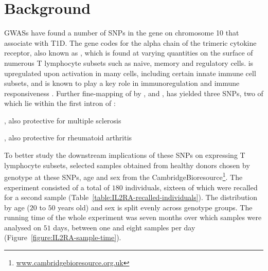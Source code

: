 \section{Background}

\Glspl{GWAS} have found a number of \glspl{SNP} in the  gene on chromosome 10 that associate with T1D.
The  gene codes for the alpha chain of the trimeric  cytokine receptor, also known as ,  
which is found at varying quantities on the surface of numerous T lymphocyte subsets such as naive, memory and
regulatory cells.
 is upregulated upon activation in many cells, including certain innate immune cell subsets,
and is known to play a key role in immunoregulation and immune responsiveness \citep{Brusko:2009bn,Boyman:2012cy}.
Further fine-mapping of  by \citet{Lowe:2007ij}, \cite{Smyth:2008kx} and \cite{Maier:2009hh}, has yielded three SNPs, two of which lie within
the first intron of :
\begin{itemise}
  \item {}  
  \item {}, also protective for multiple sclerosis \citep{Beecham:2013hh}
  \item {}, also protective for rheumatoid arthritis \citep{Stahl:2010dy}
\end{itemise}


To better study the downstream implications of these SNPs on  expressing T lymphocyte 
subsets, \citet{Dendrou:2009dv} selected samples obtained from healthy donors
chosen by genotype at these SNPs, age and sex from the CambridgeBioresource\footnote{\url{www.cambridgebioresource.org.uk}}.
The experiment consisted of a total of $180$ individuals, sixteen of which were recalled for a second sample (Table~\ref{table:IL2RA-recalled-individuals}).
The distribution by age ($20$ to $50$ years old) and sex is split evenly across genotype groups.  
The running time of the whole experiment was seven months over which samples were analysed on $51$ days,
between one and eight samples per day (Figure~\ref{figure:IL2RA-sample-time}).  

